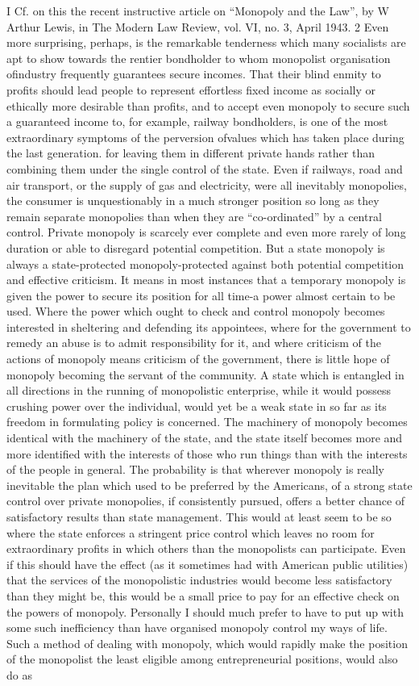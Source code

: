 \documentclass[11pt,openany]{book}
\begin{document}
I Cf. on this the recent instructive article on ``Monopoly and the Law'', by W Arthur Lewis, in The Modern Law Review, vol. VI, no. 3, April 1943. 2 Even more surprising, perhaps, is the remarkable tenderness which many socialists are apt to show towards the rentier bondholder to whom monopolist organisation ofindustry frequently guarantees secure incomes. That their blind enmity to profits should lead people to represent effortless fixed income as socially or ethically more desirable than profits, and to accept even monopoly to secure such a guaranteed income to, for example, railway bondholders, is one of the most extraordinary symptoms of the perversion ofvalues which has taken place during the last generation. for leaving them in different private hands rather than combining them under the single control of the state. Even if railways, road and air transport, or the supply of gas and electricity, were all inevitably monopolies, the consumer is unquestionably in a much stronger position so long as they remain separate monopolies than when they are ``co-ordinated'' by a central control. Private monopoly is scarcely ever complete and even more rarely of long duration or able to disregard potential competition. But a state monopoly is always a state-protected monopoly-protected against both potential competition and effective criticism. It means in most instances that a temporary monopoly is given the power to secure its position for all time-a power almost certain to be used. Where the power which ought to check and control monopoly becomes interested in sheltering and defending its appointees, where for the government to remedy an abuse is to admit responsibility for it, and where criticism of the actions of monopoly means criticism of the government, there is little hope of monopoly becoming the servant of the community. A state which is entangled in all directions in the running of monopolistic enterprise, while it would possess crushing power over the individual, would yet be a weak state in so far as its freedom in formulating policy is concerned. The machinery of monopoly becomes identical with the machinery of the state, and the state itself becomes more and more identified with the interests of those who run things than with the interests of the people in general. The probability is that wherever monopoly is really inevitable the plan which used to be preferred by the Americans, of a strong state control over private monopolies, if consistently pursued, offers a better chance of satisfactory results than state management. This would at least seem to be so where the state enforces a stringent price control which leaves no room for extraordinary profits in which others than the monopolists can participate. Even if this should have the effect (as it sometimes had with American public utilities) that the services of the monopolistic industries would become less satisfactory than they might be, this would be a small price to pay for an effective check on the powers of monopoly. Personally I should much prefer to have to put up with some such inefficiency than have organised monopoly control my ways of life. Such a method of dealing with monopoly, which would rapidly make the position of the monopolist the least eligible among entrepreneurial positions, would also do as 
\end{document}
